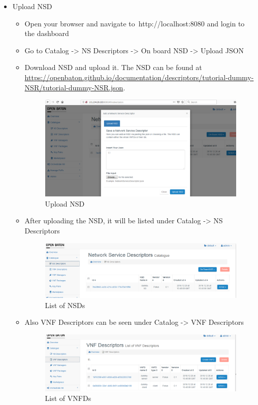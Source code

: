 \begin{itemize}
\begin{itemize}
				\item Upload NSD
				\begin{itemize}
					\item Open your browser and navigate to http://localhost:8080 and login to the dashboard
					\item Go to Catalog -> NS Descriptors -> On board NSD -> Upload JSON
					\item Download NSD and upload it. The NSD can be found at \hyperlink{name}{https://openbaton.github.io/documentation/descriptors/tutorial-dummy-NSR/tutorial-dummy-NSR.json}. 
					\begin{figure} [h]
						\centering
						\includegraphics[width=0.7\linewidth]{figures/uploadNSD}
						\caption{Upload NSD}
						\label{fig:uploadNSD}
					\end{figure}
					\item After uploading the NSD, it will be listed under Catalog -> NS Descriptors
					\begin{figure} [h]
						\centering
						\includegraphics[width=0.7\linewidth]{figures/NSDList}
						\caption{List of NSDs}
						\label{fig:NSDList}
					\end{figure}
					\item Also VNF Descriptors can be seen under Catalog -> VNF Descriptors				
					\begin{figure} [h]
						\centering
						\includegraphics[width=0.7\linewidth]{figures/VNFDList}
						\caption{List of VNFDs}
						\label{fig:VNFDList}
					\end{figure}
				\end{itemize}
			

\end{itemize}
\end{itemize}
